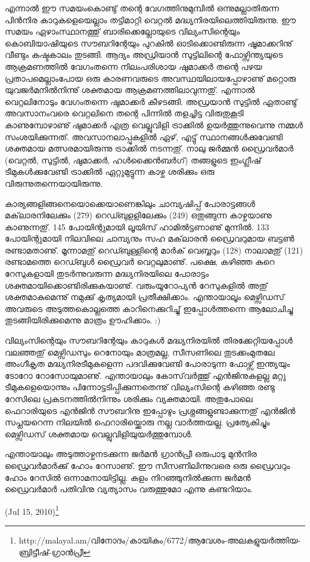 എന്നാല്‍ ഈ സമയംകൊണ്ടു് തന്റെ വേഗത്തിനുമുമ്പില്‍ ഒന്നുമല്ലാതിരുന്ന പിന്‍നിര കാറുകളെയെല്ലാം തട്ടിമാറ്റി വെറ്റല്‍ 
മദ്ധ്യനിരയിലെത്തിയിരുന്നു. ഈ സമയം ഏഴാംസ്ഥാനത്തു് ബാരിക്കെല്ലോയുടെ വില്യംസിന്റെയും കൊബിയാഷിയുടെ സൗബറിന്റേയും 
പുറകില്‍ ഓടിക്കൊണ്ടിരുന്ന ഷൂമാക്കറിനു് വീണ്ടും കഷ്ടകാലം തുടങ്ങി. ആദ്യം അഡ്രിയാന്‍ സുട്ടിലിന്റെ ഫോഴ്സിന്ത്യയുടെ ആക്രമണത്തില്‍ 
വേഗംതന്നെ നിലംപരിശായ ഷുമാക്കര്‍ തന്റെ പഴയ പ്രതാപമെല്ലാംപോയ ഒരു കാരണവരുടെ അവസ്ഥയിലായപ്പോഴാണു് മറ്റൊരു
 യുവജര്‍മനില്‍നിന്നു് ശക്തമായ ആക്രമണത്തിലാവുന്നതു്. എന്നാല്‍ വെറ്റലിനോടും വേഗംതന്നെ ഷുമാക്കര്‍ കീഴടങ്ങി. അഡ്രയാന്‍ 
 സുട്ടില്‍ ഏതാണ്ടു് അവസാനംവരെ വെറ്റലിനെ തന്റെ പിന്നില്‍ തളച്ചിട്ട വിരുതുകൂടി കാണുമ്പോഴാണു് ഷുമാക്കര്‍ എത്ര വെല്ലുവിളി 
 ട്രാക്കില്‍ ഉയര്‍ത്തുന്നുവെന്നു നമ്മള്‍ സംശയിക്കുന്നത്. അവസാനലാപ്പുകളില്‍ ഏഴ്, എട്ടു് സ്ഥാനങ്ങള്‍ക്കുവേണ്ടി ശക്തമായ 
 മത്സരമായിരുന്നു ട്രാക്കില്‍ നടന്നതു്. നാലു ജര്‍മ്മന്‍ ഡ്രൈവര്‍മാര്‍ (വെറ്റല്‍, സുട്ടില്‍, ഷുമാക്കര്‍, ഹള്‍ക്കൈന്‍ബര്‍ഗ്) തങ്ങളുടെ ഇംഗ്ലീഷ് 
 ടീമുകള്‍ക്കുവേണ്ടി ട്രാക്കില്‍ ഏറ്റുമുട്ടുന്ന കാഴ്ച ശരിക്കും ഒരു വിരുന്നുതന്നെയായിരുന്നു.

കാര്യങ്ങളിങ്ങനെയൊക്കെയാണെങ്കിലും ചാമ്പ്യഷിപ്പ് പോരാട്ടങ്ങള്‍ മക്‌ലാരനിലേക്കും (279) റെഡ്ബുളളിലേക്കും (249) ഒതുങ്ങുന്ന 
കാഴ്ചയാണു കാണുന്നതു്. 145 പോയിന്റുമായി ലൂയിസ് ഹാമില്‍ട്ടണാണു് മുന്നില്‍. 133 പോയിന്റുമായി നിലവിലെ ചാമ്പ്യനും സഹ മക്‌ലാരന്‍ 
ഡ്രൈവറുമായ ബട്ടണ്‍ രണ്ടാമതാണു്. മൂന്നാമതു് റെഡ്ബുള്ളിന്റെ മാര്‍ക് വെബ്ബറും (128) നാലാമതു് (121) രണ്ടാമത്തെ റെഡ്ബുള്‍ 
ഡ്രൈവര്‍ വെറ്റലുമാണു്. പക്ഷെ, കഴിഞ്ഞ കുറെ റേസുകളായി തുടര്‍ന്നുവരുന്ന മദ്ധ്യനിരയിലെ പോരാട്ടം ശക്തമായിക്കൊണ്ടിരിക്കുകയാണു്.
 വരുംയൂറോപ്യന്‍ റേസുകളില്‍ അതു് ശക്തമാകുമെന്നു് നമുക്കു് കൃത്യമായി പ്രതീക്ഷിക്കാം. എന്തായാലൂം മെഴ്സിഡസ് അവരുടെ 
 അടുത്തകൊല്ലത്തെ കാറിനെക്കുറിച്ചു് ഇപ്പോള്‍ത്തന്നെ ആലോചിച്ചു തുടങ്ങിയിരിക്കുമെന്നു മാത്രം ഊഹിക്കാം. :)

വില്യംസിന്റെയും സൗബറിന്റേയും കാറുകള്‍ മദ്ധ്യനിരയില്‍ തിരക്കേറ്റിയപ്പോള്‍ വലഞ്ഞതു് മെഴ്സിഡസും റെനോയും മാത്രമല്ല, 
സീസണിലെ തുടക്കംമുതലേ അംഗീകൃത മദ്ധ്യനിരടീമുകളെന്ന പദവിക്കുവേണ്ടി പോരാടുന്ന ഫോഴ്സ് ഇന്ത്യയും ടോറോ റോസോയുമാണു്. 
എന്തായാലും കോസ്‌വര്‍ത്തു് എന്‍ജിനുകളല്ല മറ്റു ടീമുകളെയൊന്നും പിന്നോട്ടടിപ്പിക്കുന്നതെന്നു് വില്യംസിന്റെ കഴിഞ്ഞ രണ്ടു റേസിലെ 
പ്രകടനത്തില്‍നിന്നും ശരിക്കും വ്യക്തമായി. അതുപോലെ ഫെറാരിയുടെ എന്‍ജിന്‍ സൗബറിനു ഇപ്പോഴും പ്രശ്നങ്ങളുണ്ടാക്കുന്നതു് 
എന്‍ജിന്‍ സപ്ലയറെന്ന നിലയില്‍ ഫെറാരിയ്ക്കൊരു നല്ല വാര്‍ത്തയല്ല. പ്രത്യേകിച്ചും മെഴ്സിഡസ് ശക്തമായ വെല്ലുവിളിയുയര്‍ത്തുമ്പോള്‍.

എന്തായാലും അടുത്താഴ്ചനടക്കുന്ന ജര്‍മന്‍ ഗ്രാന്‍പ്രീ ഒരുപാടു മുന്‍നിര ഡ്രൈവര്‍മാര്‍ക്കു് ഹോം റേസാണു്. ഈ സീസണിലിന്നുവരെ 
ഒരു ഡ്രൈവറും ഹോം റേസില്‍ ഒന്നാമനായിട്ടില്ല. കളം നിറഞ്ഞുനില്‍ക്കുന്ന ജര്‍മന്‍ ഡ്രൈവര്‍മാര്‍ പതിവിനു വ്യത്യാസം വരുത്തുമോ 
എന്നു കണ്ടറിയാം.

\begin{flushright}(Jul 15, 2010)\footnote{http://malayal.am/വിനോദം/കായികം/6772/ആവേശം-അലകളുയര്‍ത്തിയ-ബ്രിട്ടീഷ്-ഗ്രാന്‍പ്രീ}\end{flushright}
\newpage
